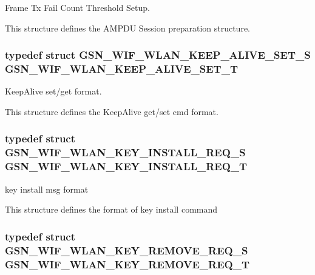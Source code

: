 Frame Tx Fail Count Threshold Setup. 

This structure defines the AMPDU Session preparation structure. \hypertarget{a00677_ga05b94921534c912004364babe9d0c9e9}{
\subsubsection[{GSN\_\-WIF\_\-WLAN\_\-KEEP\_\-ALIVE\_\-SET\_\-T}]{\setlength{\rightskip}{0pt plus 5cm}typedef struct {\bf GSN\_\-WIF\_\-WLAN\_\-KEEP\_\-ALIVE\_\-SET\_\-S}  {\bf GSN\_\-WIF\_\-WLAN\_\-KEEP\_\-ALIVE\_\-SET\_\-T}}}
\label{a00677_ga05b94921534c912004364babe9d0c9e9}


KeepAlive set/get format. 

This structure defines the KeepAlive get/set cmd format. \hypertarget{a00677_gaf02b17f4ae1181f48eafc5cafc75a98b}{
\subsubsection[{GSN\_\-WIF\_\-WLAN\_\-KEY\_\-INSTALL\_\-REQ\_\-T}]{\setlength{\rightskip}{0pt plus 5cm}typedef struct {\bf GSN\_\-WIF\_\-WLAN\_\-KEY\_\-INSTALL\_\-REQ\_\-S} {\bf GSN\_\-WIF\_\-WLAN\_\-KEY\_\-INSTALL\_\-REQ\_\-T}}}
\label{a00677_gaf02b17f4ae1181f48eafc5cafc75a98b}


key install msg format 

This structure defines the format of key install command \hypertarget{a00677_gab7781e4db5d81b8372ab59ea540b6f04}{
\subsubsection[{GSN\_\-WIF\_\-WLAN\_\-KEY\_\-REMOVE\_\-REQ\_\-T}]{\setlength{\rightskip}{0pt plus 5cm}typedef struct {\bf GSN\_\-WIF\_\-WLAN\_\-KEY\_\-REMOVE\_\-REQ\_\-S} {\bf GSN\_\-WIF\_\-WLAN\_\-KEY\_\-REMOVE\_\-REQ\_\-T}}}
\label{a00677_gab7781e4db5d81b8372ab59ea540b6f04}


